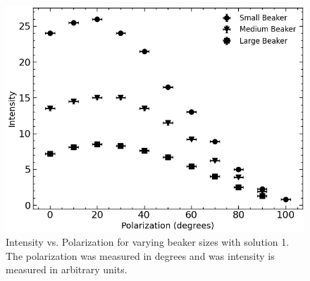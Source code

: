 \begin{figure}[H]
    \begin{center}
        \includegraphics[width=\columnwidth]{../figures/solution1.png}
    \end{center}
    \caption{Intensity vs. Polarization for varying beaker sizes with solution 1. The polarization was measured in degrees and was intensity is measured in arbitrary units.}
    \label{fig:solution1}
\end{figure}

